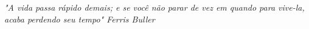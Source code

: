 \begin{dedicatoria}
   \vspace*{\fill}
   \centering
   \noindent

   \textit{"A vida passa rápido demais; e se você não parar de vez em quando para vive-la, acaba perdendo seu tempo" Ferris Buller} \vspace*{\fill}
\end{dedicatoria}
